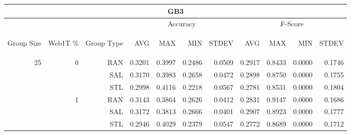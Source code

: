 \begin{center}
\begin{table}[htbp] 
 \begin{center}
\begin{tabular}{ | r | r | r | r | r | r | r | r | r | r | r |}
\hline
\multicolumn{11}{|c|}{GB3}\\
\hline
 & & & \multicolumn{4}{|c|}{Accuracy} & \multicolumn{4}{|c|}{F-Score}\\ \cline{4-11}
\begin{sideways}Group Size\end{sideways} & \begin{sideways}Web1T \%\end{sideways} & \begin{sideways}Group Type\end{sideways} & \begin{sideways}AVG\end{sideways} & \begin{sideways}MAX\end{sideways} & \begin{sideways}MIN\end{sideways} & \begin{sideways}STDEV\end{sideways} & \begin{sideways}AVG\end{sideways} & \begin{sideways}MAX\end{sideways} & \begin{sideways}MIN\end{sideways} & \begin{sideways}STDEV\end{sideways}\\
\hline
\multirow{15}{*}{25}
 & \multirow{3}{*}{0} & RAN & 0.3201 & 0.3997 & 0.2486 & 0.0509 & 0.2917 & 0.8433 & 0.0000 & 0.1746\\ \cline{3-11}
 &   & SAL & 0.3170 & 0.3983 & 0.2658 & 0.0472 & 0.2898 & 0.8750 & 0.0000 & 0.1755\\ \cline{3-11}
 &   & STL & 0.2998 & 0.4116 & 0.2218 & 0.0567 & 0.2781 & 0.8531 & 0.0000 & 0.1804\\ \cline{2-11}
 & \multirow{3}{*}{1} & RAN & 0.3143 & 0.3864 & 0.2626 & 0.0412 & 0.2831 & 0.9147 & 0.0000 & 0.1686\\ \cline{3-11}
 &   & SAL & 0.3172 & 0.3813 & 0.2666 & 0.0401 & 0.2907 & 0.8923 & 0.0000 & 0.1777\\ \cline{3-11}
 &   & STL & 0.2946 & 0.4029 & 0.2379 & 0.0547 & 0.2772 & 0.8689 & 0.0000 & 0.1712\\ \cline{2-11}

\end{tabular}
\end{center}
\end{table}
\end{center}

